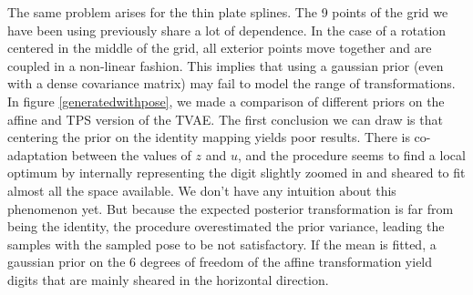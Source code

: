 \documentclass[letterpaper, twoside]{article}
\begin{document}
  The same problem arises for the thin plate splines. The 9 points of the grid we have been using previously share a lot of dependence. In the case of a rotation centered in the middle of the grid, all exterior points move together and are coupled in a non-linear fashion. This implies that using a gaussian prior (even with a dense covariance matrix) may fail to model the range of transformations.\\

  In figure \ref{generatedwithpose}, we made a comparison of different priors on the affine and TPS version of the TVAE. The first conclusion we can draw is that centering the prior on the identity mapping yields poor results. There is co-adaptation between the values of $z$ and $u$, and the procedure seems to find a local optimum by internally representing the digit slightly zoomed in and sheared to fit almost all the space available. We don't have any intuition about this phenomenon yet. But because the expected posterior transformation is far from being the identity, the procedure overestimated the prior variance, leading the samples with the sampled pose to be not satisfactory. If the mean is fitted, a gaussian prior on the 6 degrees of freedom of the affine transformation yield digits that are mainly sheared in the horizontal direction.\\
\end{document}
